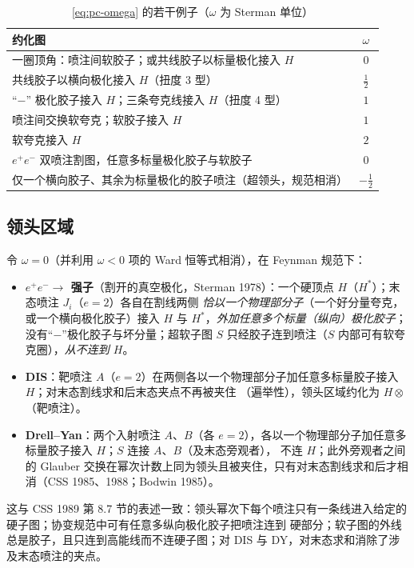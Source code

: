 \begin{table}[htbp]\centering\small
\caption{\cref{eq:pc-omega} 的若干例子（$\omega$ 为 Sterman 单位）}\label{tab:pc-examples}
\begin{tabular}{@{}lc@{}}\toprule
约化图 & $\omega$\\\midrule
一圈顶角：喷注间软胶子；或共线胶子以标量极化接入 $H$ & $0$\\
共线胶子以横向极化接入 $H$（扭度 3 型） & $\tfrac12$\\
“$-$” 极化胶子接入 $H$；三条夸克线接入 $H$（扭度 4 型） & $1$\\
喷注间交换软夸克；软胶子接入 $H$ & $1$\\
软夸克接入 $H$ & $2$\\
$e^+e^-$ 双喷注割图，任意多标量极化胶子与软胶子 & $0$\\
仅一个横向胶子、其余为标量极化的胶子喷注（超领头，规范相消） & $-\tfrac12$\\\bottomrule
\end{tabular}
\end{table}

\subsection{领头区域}

令 $\omega=0$（并利用 $\omega<0$ 项的 Ward 恒等式相消），在 Feynman 规范下：
\begin{itemize}[leftmargin=2em]
\item \textbf{$e^+e^-\to$ 强子}（割开的真空极化，Sterman 1978）：一个硬顶点 $H$（$H^*$）；末态喷注 $J_i$（$e=2$）各自在割线两侧
  \emph{恰以一个物理部分子}（一个好分量夸克，或一个横向极化胶子）接入 $H$ 与 $H^*$，\emph{外加任意多个标量（纵向）极化胶子}；
  没有“$-$”极化胶子与坏分量；超软子图 $S$ 只经胶子连到喷注（$S$ 内部可有软夸克圈），\emph{从不连到 $H$}。
\item \textbf{DIS}：靶喷注 $A$（$e=2$）在两侧各以一个物理部分子加任意多标量胶子接入 $H$；对末态割线求和后末态夹点不再被夹住
  （遍举性），领头区域约化为 $H\otimes$（靶喷注）。
\item \textbf{Drell--Yan}：两个入射喷注 $A$、$B$（各 $e=2$），各以一个物理部分子加任意多标量胶子接入 $H$；$S$ 连接 $A$、$B$（及末态旁观者），
  不连 $H$；此外旁观者之间的 Glauber 交换在幂次计数上同为领头且被夹住，只有对末态割线求和后才相消（CSS 1985、1988；Bodwin 1985）\tagA。
\end{itemize}
这与 CSS 1989 第 8.7 节的表述一致：领头幂次下每个喷注只有一条线进入给定的硬子图；协变规范中可有任意多纵向极化胶子把喷注连到
硬部分；软子图的外线总是胶子，且只连到高能线而不连硬子图；对 DIS 与 DY，对末态求和消除了涉及末态喷注的夹点。

